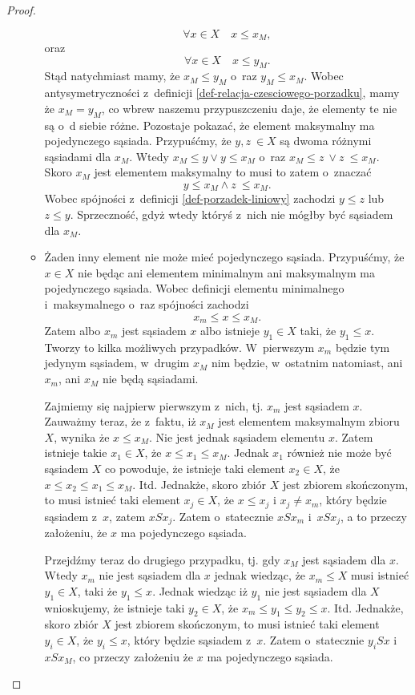\documentclass[12pt,a4paper]{report}
\begin{document}
\begin{proof}
\begin{enumerate}
\begin{itemize}
$$
\forall x \in X \quad x \leq x_M,
$$
oraz 
$$
\forall x \in X \quad x \leq y_M.
$$
Stąd natychmiast mamy, że $x_M \leq y_M$ o~raz $y_M \leq  x_M$. Wobec antysymetryczności z~definicji \ref{def-relacja-czesciowego-porzadku}, mamy że $x_M = y_M$, co wbrew naszemu przypuszczeniu daje, że elementy te nie są o~d siebie różne.
Pozostaje pokazać, że element maksymalny ma pojedynczego sąsiada. Przypuśćmy, że $y, z~\in X$ są dwoma różnymi sąsiadami dla $x_M$. Wtedy $ x_M \leq y \lor y \leq x_M$ o~raz $ x_M \leq z~\lor z~\leq x_M$. Skoro $x_M$ jest elementem maksymalny to musi to zatem o~znaczać
$$
y \leq x_M \land z~\leq x_M.
$$ 
Wobec spójności z~definicji \ref{def-porzadek-liniowy} zachodzi $y \leq z$ lub $z \leq y$. Sprzeczność, gdyż wtedy któryś z~nich nie mógłby być sąsiadem dla $x_M$.

\item Żaden inny element nie może mieć pojedynczego sąsiada. Przypuśćmy, że $x \in X$ nie będąc ani elementem minimalnym ani maksymalnym ma pojedynczego sąsiada. Wobec definicji elementu minimalnego i~maksymalnego o~raz spójności zachodzi
$$
x_m \leq x \leq x_M.
$$
Zatem albo $x_m$ jest sąsiadem $x$ albo istnieje $y_1 \in X$ taki, że $y_1 \leq x$.
Tworzy to kilka możliwych przypadków. W~pierwszym $x_m$ będzie tym jedynym sąsiadem, w~drugim $x_M$ nim będzie, w~ostatnim natomiast, ani $x_m$, ani $x_M$ nie będą sąsiadami.

Zajmiemy się najpierw pierwszym z~nich, tj. $x_m$ jest sąsiadem $x$. Zauważmy teraz, że z~faktu, iż $x_M$ jest elementem maksymalnym zbioru $X$, wynika że $ x \leq x_M$. Nie jest jednak sąsiadem elementu $x$. Zatem istnieje takie $x_1 \in X$, że $x\leq x_1 \leq x_M$. Jednak $x_1$ również nie może być sąsiadem $X$ co powoduje, że istnieje taki element $x_2 \in X$, że $x \leq x_2 \leq x_1 \leq x_M$. Itd. Jednakże, skoro zbiór $X$ jest zbiorem skończonym, to musi istnieć taki element $x_j \in X$, że $x \leq x_j \textrm{ i~} x_j \neq x_m$, który będzie sąsiadem z~$x$, zatem $xSx_j$. Zatem o~statecznie $xSx_m$ i~$xSx_j$, a to przeczy założeniu, że $x$ ma pojedynczego sąsiada. 

Przejdźmy teraz do drugiego przypadku, tj. gdy $x_M$ jest sąsiadem dla $x$. Wtedy $x_m$ nie jest sąsiadem dla $x$ jednak wiedząc, że $x_m \leq X$ musi istnieć $y_1\in X$, taki że $y_1 \leq x$. Jednak wiedząc iż $y_1$ nie jest sąsiadem dla $X$ wnioskujemy, że istnieje taki $y_2 \in X$, że $x_m \leq y_1 \leq y_2 \leq x$. Itd.  Jednakże, skoro zbiór $X$ jest zbiorem skończonym, to musi istnieć taki element $y_i \in X$, że $y_i \leq x$, który będzie sąsiadem z~$x$. Zatem o~statecznie $y_iSx$ i~$xSx_M$, co przeczy założeniu że $x$ ma pojedynczego sąsiada.


\end{itemize}
\end{enumerate}
\end{proof}
\end{document}
